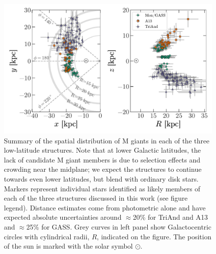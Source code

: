 \documentclass[galaxies,article,submit,moreauthors,pdftex,10pt,a4paper]{mdpi}
\begin{document}
\begin{figure}[!ht]
\label{fig:ting}
\centering
\includegraphics[width=6 in]{figures/xy_Rz.pdf}
\caption{\label{fig:ting}
Summary of the spatial distribution of M giants in each of the three
low-latitude structures.
Note that at lower Galactic latitudes, the lack of candidate M giant members is
due to selection effects and crowding near the midplane; we expect the
structures to continue towards even lower latitudes, but blend with ordinary
disk stars.
Markers represent individual stars identified as likely members of each of the
three structures discussed in this work (see figure legend).
Distance estimates come from photometric alone and have expected absolute
uncertainties around $\approx$20\% for TriAnd and A13 \cite{sheffield14,li17}
and $\approx$25\% for GASS.
Grey curves in left panel show Galactocentric circles with cylindrical radii,
$R$, indicated on the figure.
The position of the sun is marked with the solar symbol $\odot$.
}
\end{figure}
\end{document}
